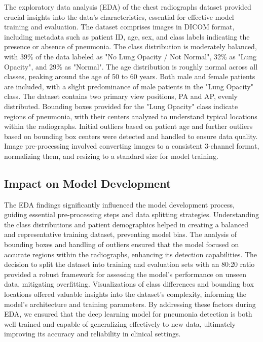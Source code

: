 The exploratory data analysis (EDA) of the chest radiographs dataset provided crucial insights into the data's characteristics, essential for effective model training and evaluation. The dataset comprises images in DICOM format, including metadata such as patient ID, age, sex, and class labels indicating the presence or absence of pneumonia. The class distribution is moderately balanced, with 39\% of the data labeled as "No Lung Opacity / Not Normal", 32\% as "Lung Opacity", and 29\% as "Normal". The age distribution is roughly normal across all classes, peaking around the age of 50 to 60 years. Both male and female patients are included, with a slight predominance of male patients in the "Lung Opacity" class. The dataset contains two primary view positions, PA and AP, evenly distributed. Bounding boxes provided for the "Lung Opacity" class indicate regions of pneumonia, with their centers analyzed to understand typical locations within the radiographs. Initial outliers based on patient age and further outliers based on bounding box centers were detected and handled to ensure data quality. Image pre-processing involved converting images to a consistent 3-channel format, normalizing them, and resizing to a standard size for model training.

\subsection{Impact on Model Development}
\label{subsec:chap2 section 3.2}

The EDA findings significantly influenced the model development process, guiding essential pre-processing steps and data splitting strategies. Understanding the class distributions and patient demographics helped in creating a balanced and representative training dataset, preventing model bias. The analysis of bounding boxes and handling of outliers ensured that the model focused on accurate regions within the radiographs, enhancing its detection capabilities. The decision to split the dataset into training and evaluation sets with an 80:20 ratio provided a robust framework for assessing the model's performance on unseen data, mitigating overfitting. Visualizations of class differences and bounding box locations offered valuable insights into the dataset's complexity, informing the model's architecture and training parameters. By addressing these factors during EDA, we ensured that the deep learning model for pneumonia detection is both well-trained and capable of generalizing effectively to new data, ultimately improving its accuracy and reliability in clinical settings.
